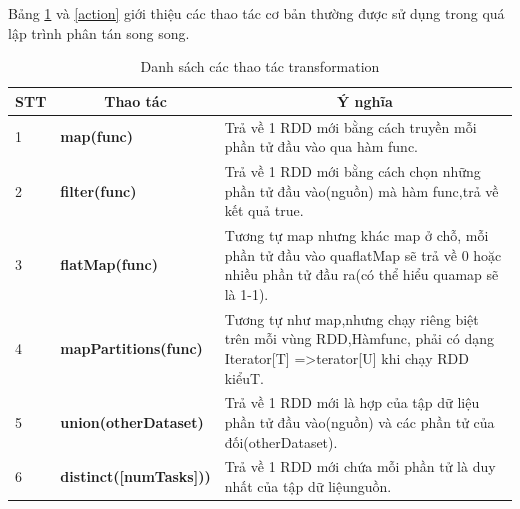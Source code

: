 Bảng \ref{transformation} và \ref{action} giới thiệu các thao tác cơ bản thường được sử dụng trong quá lập trình phân tán song song.
\begin{table}[H]
	\centering
	\caption{Danh sách các thao tác transformation}
	\label{transformation}
	\begin{tabular}{p{1cm}p{5cm}p{10cm}}
		\toprule
		\textbf{STT} & \multicolumn{1}{c}{Thao tác}                        & \multicolumn{1}{c}{\textbf{Ý nghĩa}}                                                                                                                                                                                                       \\ \midrule
		1            & \textbf{map(func)}                                  & Trả về 1 RDD mới bằng cách truyền mỗi phần tử đầu vào qua hàm func.                                                                                                                                                                        \\ \midrule
		2            & \textbf{filter(func)}                               & Trả về 1 RDD mới bằng cách chọn những phần tử đầu vào(nguồn) mà hàm func,trả về kết quả true.                                                                                                                                              \\ \midrule
		3            & \textbf{flatMap(func)}                              & Tương tự map nhưng khác map ở chỗ, mỗi phần tử đầu vào quaflatMap sẽ trả về 0 hoặc nhiều phần tử đầu ra(có thể hiểu quamap sẽ là 1-1).                                                                                                     \\ \midrule
		4            & \textbf{mapPartitions(func)}                        & Tương tự như map,nhưng chạy riêng biệt trên mỗi vùng RDD,Hàmfunc, phải có dạng Iterator{[}T{]} =\textgreater  terator{[}U{]} khi chạy RDD kiểuT.                                                                                           \\ \midrule
		5            & \textbf{union(otherDataset)}                        & Trả về 1 RDD mới là hợp của tập dữ liệu phần tử đầu vào(nguồn) và các phần tử của đối(otherDataset).                                                                                                                                       \\ \midrule
		6            & \textbf{distinct({[}numTasks{]}))}                  & Trả về 1 RDD mới chứa mỗi phần tử là duy nhất của tập dữ liệunguồn.                                                                                                                                                                        \\ \midrule

\end{tabular}
\end{table}
